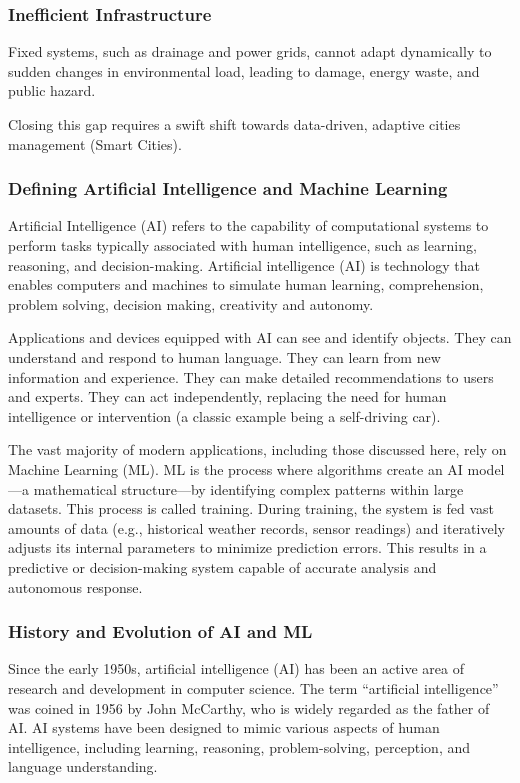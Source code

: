 \documentclass[12pt]{article}
\begin{document}
\subsubsection{Inefficient Infrastructure} Fixed systems, such as drainage and power grids, cannot adapt dynamically to 
sudden changes in environmental load, leading to damage, energy waste, and public hazard.

Closing this gap requires a swift shift towards data-driven, adaptive cities management (Smart Cities).

\subsubsection{Defining Artificial Intelligence and Machine Learning}

Artificial Intelligence (AI) refers to the capability of computational systems to perform tasks typically associated 
with human intelligence, such as learning, reasoning, and decision-making. Artificial intelligence (AI) is technology that 
enables computers and machines to simulate human learning, comprehension, problem solving, decision making, creativity and autonomy.

Applications and devices equipped with AI can see and identify objects. They can understand and respond to human language. 
They can learn from new information and experience. They can make detailed recommendations to users and experts. They can act 
independently, replacing the need for human intelligence or intervention (a classic example being a self-driving car)\cite{ibmThinkAI}.

The vast majority of modern applications, 
including those discussed here, rely on Machine Learning (ML). ML is the process where algorithms create an AI model—a 
mathematical structure—by identifying complex patterns within large datasets. This process is called training. During training, 
the system is fed vast amounts of data (e.g., historical weather records, sensor readings) and iteratively adjusts its internal 
parameters to minimize prediction errors. This results in a predictive or decision-making system capable of accurate analysis 
and autonomous response.

\subsubsection{History and Evolution of AI and ML}
Since the early 1950s, artificial intelligence (AI) has been an active area of research and development in computer science.
The term “artificial intelligence” was coined in 1956 by John McCarthy\cite{datascientest_mccarthy}, who is widely regarded as the father of AI.
AI systems have been designed to mimic various aspects of human intelligence, including learning, reasoning, problem-solving, 
perception, and language understanding.
\end{document}

